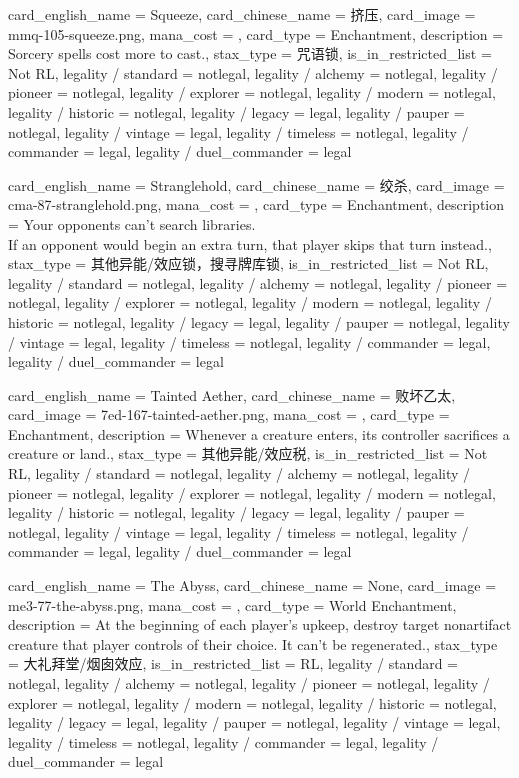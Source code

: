 \documentclass[lang = cn, color = black, 10pt]{AllThatStax}
\begin{document}
\card
{
	card_english_name = {Squeeze},
	card_chinese_name = {挤压},
	card_image = mmq-105-squeeze.png,
	mana_cost = ,
	card_type = Enchantment,
	description = {Sorcery spells cost  more to cast.},
	stax_type = 咒语锁,
	is_in_restricted_list = Not RL,
	legality / standard = notlegal,
	legality / alchemy = notlegal,
	legality / pioneer = notlegal,
	legality / explorer = notlegal,
	legality / modern = notlegal,
	legality / historic = notlegal,
	legality / legacy = legal,
	legality / pauper = notlegal,
	legality / vintage = legal,
	legality / timeless = notlegal,
	legality / commander = legal,
	legality / duel_commander = legal
}

\card
{
	card_english_name = {Stranglehold},
	card_chinese_name = {绞杀},
	card_image = cma-87-stranglehold.png,
	mana_cost = ,
	card_type = Enchantment,
	description = {Your opponents can't search libraries.\\
		If an opponent would begin an extra turn, that player skips that turn instead.},
	stax_type = 其他异能/效应锁，搜寻牌库锁,
	is_in_restricted_list = Not RL,
	legality / standard = notlegal,
	legality / alchemy = notlegal,
	legality / pioneer = notlegal,
	legality / explorer = notlegal,
	legality / modern = notlegal,
	legality / historic = notlegal,
	legality / legacy = legal,
	legality / pauper = notlegal,
	legality / vintage = legal,
	legality / timeless = notlegal,
	legality / commander = legal,
	legality / duel_commander = legal
}

\card
{
	card_english_name = {Tainted Aether},
	card_chinese_name = {败坏乙太},
	card_image = 7ed-167-tainted-aether.png,
	mana_cost = ,
	card_type = Enchantment,
	description = {Whenever a creature enters, its controller sacrifices a creature or land.},
	stax_type = 其他异能/效应税,
	is_in_restricted_list = Not RL,
	legality / standard = notlegal,
	legality / alchemy = notlegal,
	legality / pioneer = notlegal,
	legality / explorer = notlegal,
	legality / modern = notlegal,
	legality / historic = notlegal,
	legality / legacy = legal,
	legality / pauper = notlegal,
	legality / vintage = legal,
	legality / timeless = notlegal,
	legality / commander = legal,
	legality / duel_commander = legal
}

\card
{
	card_english_name = {The Abyss},
	card_chinese_name = {None},
	card_image = me3-77-the-abyss.png,
	mana_cost = ,
	card_type = World Enchantment,
	description = {At the beginning of each player's upkeep, destroy target nonartifact creature that player controls of their choice. It can't be regenerated.},
	stax_type = 大礼拜堂/烟囱效应,
	is_in_restricted_list = RL,
	legality / standard = notlegal,
	legality / alchemy = notlegal,
	legality / pioneer = notlegal,
	legality / explorer = notlegal,
	legality / modern = notlegal,
	legality / historic = notlegal,
	legality / legacy = legal,
	legality / pauper = notlegal,
	legality / vintage = legal,
	legality / timeless = notlegal,
	legality / commander = legal,
	legality / duel_commander = legal
}
\end{document}
